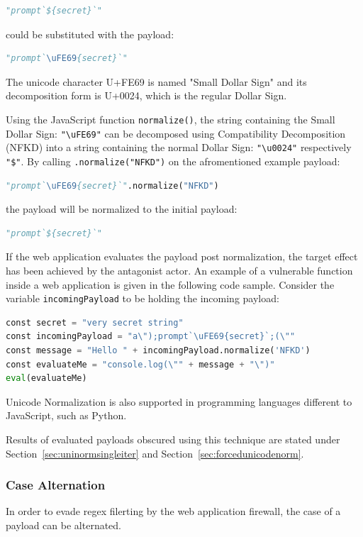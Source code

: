 \begin{lstlisting}[style=basicStyle, language=Python]
"prompt`${secret}`"
\end{lstlisting}
could be substituted with the payload:

\begin{lstlisting}[style=basicStyle, language=Python]
"prompt`\uFE69{secret}`"
\end{lstlisting}
The unicode character U+FE69 is named "Small Dollar Sign" and its decomposition form is U+0024, which is the regular Dollar Sign. \cite{comp/uni}

Using the JavaScript function \verb|normalize()|, the string containing the Small Dollar Sign: \verb|"\uFE69"| can be decomposed using Compatibility Decomposition (NFKD) into a string containing the normal Dollar Sign: \verb|"\u0024"| respectively \verb|"$"|.
By calling \verb|.normalize("NFKD")| on the afromentioned example payload:

\begin{lstlisting}[style=basicStyle, language=Python]
"prompt`\uFE69{secret}`".normalize("NFKD")
\end{lstlisting}
the payload will be normalized to the initial payload:

\begin{lstlisting}[style=basicStyle, language=Python]
"prompt`${secret}`"
\end{lstlisting}
If the web application evaluates the payload post normalization, the target effect has been achieved by the antagonist actor. An example of a vulnerable function inside a web application is given in the following code sample. Consider the variable \verb|incomingPayload| to be holding the incoming payload:

\begin{lstlisting}[style=basicStyle, language=Python]
const secret = "very secret string"
const incomingPayload = "a\");prompt`\uFE69{secret}`;(\""
const message = "Hello " + incomingPayload.normalize('NFKD')
const evaluateMe = "console.log(\"" + message + "\")"
eval(evaluateMe)
\end{lstlisting}
Unicode Normalization is also supported in programming languages different to JavaScript, such as Python. \cite{python/normalization}

Results of evaluated payloads obscured using this technique are stated under Section~\ref{sec:uninormsingleiter} and Section~\ref{sec:forcedunicodenorm}.


\subsubsection{Case Alternation}
\label{sec:casealt}
In order to evade regex filerting by the web application firewall, the case of a payload can be alternated. \cite{medium/allypetitt}

